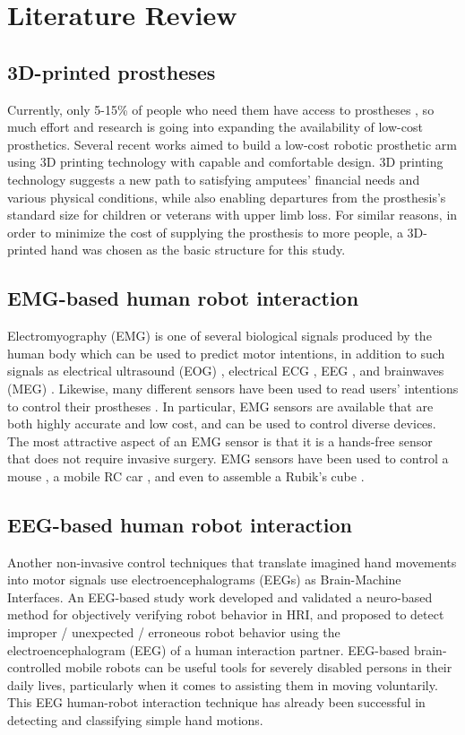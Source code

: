 \chapter{Literature Review}

\section{3D-printed prostheses}
Currently, only 5-15\% of people who need them have access to
prostheses \cite{WHO}, so much effort and research is going into
expanding the availability of low-cost prosthetics.  Several recent
works \cite{3D4}\cite{3D2} aimed to build a low-cost robotic
prosthetic arm using 3D printing technology with capable and
comfortable design. 3D printing technology suggests a new path to
satisfying amputees' financial needs and various physical conditions,
while also enabling departures from the prosthesis's standard size for
children or veterans with upper limb loss. \cite{3D3} For similar
reasons, in order to minimize the cost of supplying the prosthesis to
more people, a 3D-printed hand was chosen as the basic structure for
this study.

\section{EMG-based human robot interaction}
Electromyography (EMG) \cite{review, EMG} is one of several biological
signals produced by the human body which can be used to predict motor
intentions, in addition to such signals as electrical ultrasound (EOG)
\cite{EOG}, electrical ECG \cite{ECOG}, EEG \cite{EEG_1}, and
brainwaves (MEG) \cite{MEG}. Likewise, many different sensors have
been used to read users' intentions to control their prostheses
\cite{MMG}.  In particular, EMG sensors are available that are both
highly accurate and low cost, and can be used to control diverse
devices. The most attractive aspect of an EMG sensor is that it is a
hands-free sensor that does not require invasive surgery.  EMG
sensors \cite{controlEMG} have been used to control a mouse
\cite{mouse}, a mobile RC car \cite{RCcar}, and even to assemble a
Rubik's cube \cite{rubikcube}.

\section{EEG-based human robot interaction}
Another non-invasive control techniques
that translate imagined hand movements into motor signals use
electroencephalograms (EEGs) \cite{EEG} as Brain-Machine Interfaces.
An EEG-based study work \cite{[???]} developed and validated a neuro-based
method for objectively verifying robot behavior in HRI, and proposed to
detect improper / unexpected / erroneous robot behavior using the
electroencephalogram (EEG) of a human interaction partner.
EEG-based brain-controlled mobile robots can be useful tools for 
severely disabled persons in their daily lives, 
particularly when it comes to assisting them in moving 
voluntarily. \cite{EEG}
This EEG human-robot interaction technique has already been successful
in detecting and classifying simple hand motions. \cite{[???]}



